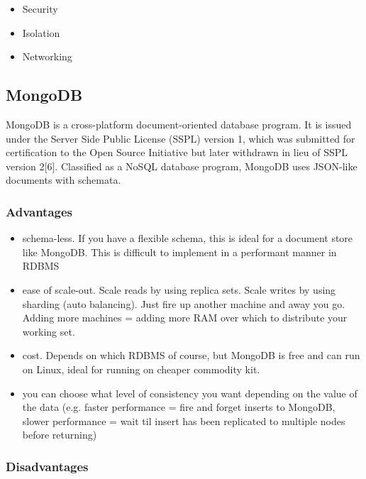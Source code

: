 \documentclass[a4paper, hidelinks, 12pt]{report}
\begin{document}
\begin{itemize}
\item{} Security
\item{} Isolation
\item{} Networking

\end{itemize}

\subsection{MongoDB}
MongoDB is a cross-platform document-oriented database program. It is issued under the Server Side Public License (SSPL) version 1, which was submitted for certification to the Open Source Initiative but later withdrawn in lieu of SSPL version 2[6]. Classified as a NoSQL database program, MongoDB uses JSON-like documents with schemata.

\subsubsection{Advantages}

\begin{itemize}
\item{} schema-less. If you have a flexible schema, this is ideal for a document store like MongoDB. This is difficult to implement in a performant manner in RDBMS
\item{} ease of scale-out. Scale reads by using replica sets. Scale writes by using sharding (auto balancing). Just fire up another machine and away you go. Adding more machines = adding more RAM over which to distribute your working set.
\item{} cost. Depends on which RDBMS of course, but MongoDB is free and can run on Linux, ideal for running on cheaper commodity kit.
\item{} you can choose what level of consistency you want depending on the value of the data (e.g. faster performance = fire and forget inserts to MongoDB, slower performance = wait til insert has been replicated to multiple nodes before returning)

\end{itemize}
\subsubsection{Disadvantages}
\end{document}
